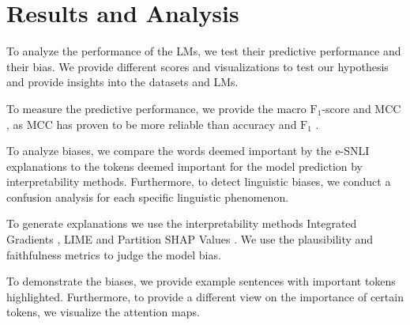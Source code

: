 \section{Results and Analysis} \label{sec:analysis}


To analyze the performance of the \acp{LM}, we test their predictive performance and their bias. We provide different scores and visualizations to test our hypothesis and provide insights into the datasets and \acp{LM}.

To measure the predictive performance, we provide the macro $\text{F}_1$-score \citep{macrof1} and \ac{MCC} \citep{mcc}, as \ac{MCC} has proven to be more reliable than accuracy and $\text{F}_1$ \citep{mccGood}.

To analyze biases, we compare the words deemed important by the \ac{e-SNLI} explanations to the tokens deemed important for the model prediction by interpretability methods. Furthermore, to detect linguistic biases, we conduct a confusion analysis for each specific linguistic phenomenon.

To generate explanations we use the interpretability methods Integrated Gradients \citep{integratedgradients}, \ac{LIME} \citep{lime} and Partition SHAP Values \citep{shap}. We use the plausibility and faithfulness \citep{ferret} metrics to judge the model bias.

To demonstrate the biases, we provide example sentences with important tokens highlighted. Furthermore, to provide a different view on the importance of certain tokens, we visualize the attention maps.